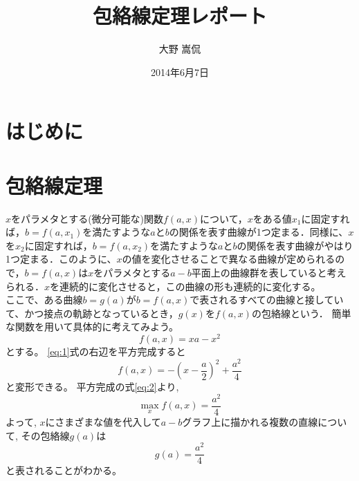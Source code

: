 \documentclass[11pt,a4j,fleqn]{jarticle}
\title{包絡線定理レポート}
\author{大野 嵩侃}
\date{2014年6月7日}
\begin{document}
\maketitle

\section{はじめに}



\section{包絡線定理}

$x$をパラメタとする(微分可能な)関数$f(a,x)$について，$x$をある値$x_1$に固定すれば，$b=f(a,x_1)$を満たすような$a$と$b$の関係を表す曲線が1つ定まる．同様に、$x$を$x_2$に固定すれば，$b=f(a,x_2)$を満たすような$a$と$b$の関係を表す曲線がやはり1つ定まる．このように、$x$の値を変化させることで異なる曲線が定められるので，$b=f(a,x)$は$x$をパラメタとする$a-b$平面上の曲線群を表していると考えられる．$x$を連続的に変化させると，この曲線の形も連続的に変化する。\\
ここで、ある曲線$b=g(a)$が$b=f(a,x)$で表されるすべての曲線と接していて、かつ接点の軌跡となっているとき，$g(x)$を$f(a,x)$の包絡線という．
簡単な関数を用いて具体的に考えてみよう。\\
\begin{equation}
f(a, x) = x a - x^2\label{eq:1}
\end{equation}
とする。
\eqref{eq:1}式の右辺を平方完成すると
\begin{equation}
f(a,  x) = -\left(x - \frac{a}{2}\right)^2 + \frac{a^2}{4} \label{eq:2}
\end{equation}
と変形できる。
平方完成の式\eqref{eq:2}より, 
\begin{equation} 
\max_{x}f(a, x) = \frac{a^2}{4} \label{eq:3}
\end{equation}
よって, $x$にさまざまな値を代入して$a-b$グラフ上に描かれる複数の直線について, その包絡線$g(a)$は
\begin{equation} 
g(a) = \frac{a^2}{4} \label{eq:4}
\end{equation}
と表されることがわかる。\\
\end{document}
